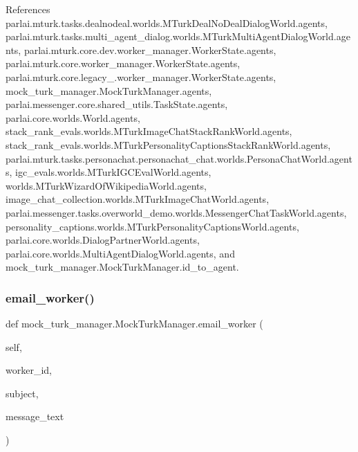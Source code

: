 References parlai.\+mturk.\+tasks.\+dealnodeal.\+worlds.\+M\+Turk\+Deal\+No\+Deal\+Dialog\+World.\+agents, parlai.\+mturk.\+tasks.\+multi\+\_\+agent\+\_\+dialog.\+worlds.\+M\+Turk\+Multi\+Agent\+Dialog\+World.\+agents, parlai.\+mturk.\+core.\+dev.\+worker\+\_\+manager.\+Worker\+State.\+agents, parlai.\+mturk.\+core.\+worker\+\_\+manager.\+Worker\+State.\+agents, parlai.\+mturk.\+core.\+legacy\+\_.\+worker\+\_\+manager.\+Worker\+State.\+agents, mock\+\_\+turk\+\_\+manager.\+Mock\+Turk\+Manager.\+agents, parlai.\+messenger.\+core.\+shared\+\_\+utils.\+Task\+State.\+agents, parlai.\+core.\+worlds.\+World.\+agents, stack\+\_\+rank\+\_\+evals.\+worlds.\+M\+Turk\+Image\+Chat\+Stack\+Rank\+World.\+agents, stack\+\_\+rank\+\_\+evals.\+worlds.\+M\+Turk\+Personality\+Captions\+Stack\+Rank\+World.\+agents, parlai.\+mturk.\+tasks.\+personachat.\+personachat\+\_\+chat.\+worlds.\+Persona\+Chat\+World.\+agents, igc\+\_\+evals.\+worlds.\+M\+Turk\+I\+G\+C\+Eval\+World.\+agents, worlds.\+M\+Turk\+Wizard\+Of\+Wikipedia\+World.\+agents, image\+\_\+chat\+\_\+collection.\+worlds.\+M\+Turk\+Image\+Chat\+World.\+agents, parlai.\+messenger.\+tasks.\+overworld\+\_\+demo.\+worlds.\+Messenger\+Chat\+Task\+World.\+agents, personality\+\_\+captions.\+worlds.\+M\+Turk\+Personality\+Captions\+World.\+agents, parlai.\+core.\+worlds.\+Dialog\+Partner\+World.\+agents, parlai.\+core.\+worlds.\+Multi\+Agent\+Dialog\+World.\+agents, and mock\+\_\+turk\+\_\+manager.\+Mock\+Turk\+Manager.\+id\+\_\+to\+\_\+agent.

\mbox{\label{classmock__turk__manager_1_1MockTurkManager_ac64f7ad4e2570f5f20a93cd080dc13c4}} 
\subsubsection{\texorpdfstring{email\+\_\+worker()}{email\_worker()}}
{\footnotesize\ttfamily def mock\+\_\+turk\+\_\+manager.\+Mock\+Turk\+Manager.\+email\+\_\+worker (\begin{DoxyParamCaption}\item[{}]{self,  }\item[{}]{worker\+\_\+id,  }\item[{}]{subject,  }\item[{}]{message\+\_\+text }\end{DoxyParamCaption})}



